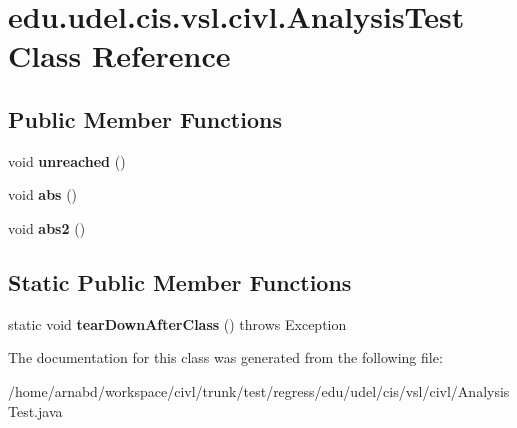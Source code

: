 \hypertarget{classedu_1_1udel_1_1cis_1_1vsl_1_1civl_1_1AnalysisTest}{}\section{edu.\+udel.\+cis.\+vsl.\+civl.\+Analysis\+Test Class Reference}
\label{classedu_1_1udel_1_1cis_1_1vsl_1_1civl_1_1AnalysisTest}
\subsection*{Public Member Functions}
\begin{DoxyCompactItemize}
\item 
\hypertarget{classedu_1_1udel_1_1cis_1_1vsl_1_1civl_1_1AnalysisTest_aa9478f02fcfd540911bcfbcdc4ec04d9}{}void {\bfseries unreached} ()\label{classedu_1_1udel_1_1cis_1_1vsl_1_1civl_1_1AnalysisTest_aa9478f02fcfd540911bcfbcdc4ec04d9}

\item 
\hypertarget{classedu_1_1udel_1_1cis_1_1vsl_1_1civl_1_1AnalysisTest_ab515b466ab8e1e54aee057caec7861ce}{}void {\bfseries abs} ()\label{classedu_1_1udel_1_1cis_1_1vsl_1_1civl_1_1AnalysisTest_ab515b466ab8e1e54aee057caec7861ce}

\item 
\hypertarget{classedu_1_1udel_1_1cis_1_1vsl_1_1civl_1_1AnalysisTest_af08d13b40d65fab8f9acabbe7c788a94}{}void {\bfseries abs2} ()\label{classedu_1_1udel_1_1cis_1_1vsl_1_1civl_1_1AnalysisTest_af08d13b40d65fab8f9acabbe7c788a94}

\end{DoxyCompactItemize}
\subsection*{Static Public Member Functions}
\begin{DoxyCompactItemize}
\item 
\hypertarget{classedu_1_1udel_1_1cis_1_1vsl_1_1civl_1_1AnalysisTest_aa98270225cc57409d8a09d6c4cee98fb}{}static void {\bfseries tear\+Down\+After\+Class} ()  throws Exception \label{classedu_1_1udel_1_1cis_1_1vsl_1_1civl_1_1AnalysisTest_aa98270225cc57409d8a09d6c4cee98fb}

\end{DoxyCompactItemize}


The documentation for this class was generated from the following file\+:\begin{DoxyCompactItemize}
\item 
/home/arnabd/workspace/civl/trunk/test/regress/edu/udel/cis/vsl/civl/Analysis\+Test.\+java\end{DoxyCompactItemize}
